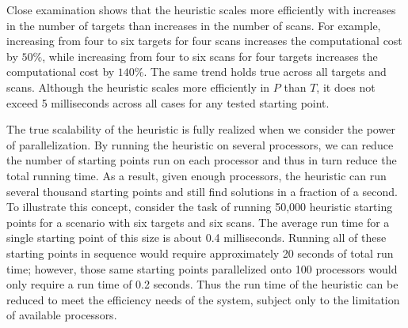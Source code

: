 Close examination shows that the heuristic scales more efficiently with increases in the number of targets than increases in the number of scans. For example, increasing from four to six targets for four scans increases the computational cost by $50\%$, while increasing from four to six scans for four targets increases the computational cost by $140\%$. The same trend holds true across all targets and scans. Although the heuristic scales more efficiently in $P$ than $T$, it does not exceed 5 milliseconds across all cases for any tested starting point.

The true scalability of the heuristic is fully realized when we consider the power of parallelization. By running the heuristic on several processors, we can reduce the number of starting points run on each processor and thus in turn reduce the total running time. As a result, given enough processors, the heuristic can run several thousand starting points and still find solutions in a fraction of a second. To illustrate this concept, consider the task of running 50,000 heuristic starting points for a scenario with six targets and six scans. The average run time for a single starting point of this size is about 0.4 milliseconds. Running all of these starting points in sequence would require approximately 20 seconds of total run time; however, those same starting points parallelized onto 100 processors would only require a run time of 0.2 seconds. Thus the run time of the heuristic can be reduced to meet the efficiency needs of the system, subject only to the limitation of available processors. 

